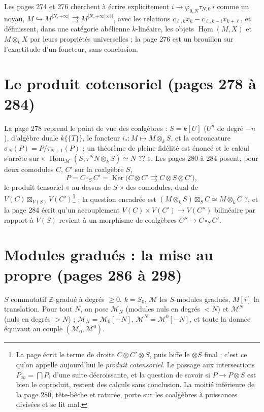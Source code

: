 \documentclass[11pt,a4paper]{article}
\begin{document}
Les pages 274 et 276 cherchent à écrire explicitement $i \to
\varphi_{0,N}\tau_{N,0}\,i$ comme un noyau, $M \hookrightarrow
M^{[N,+\infty[} \rightrightarrows M^{[N,+\infty[ \times \mathbb{N}}$, avec les
relations $c_{\ell,k}x_k - c_{\ell,k-i}x_{k+\ell}$, et définissent, dans une
catégorie abélienne $k$-linéaire, les objets $\underline{\operatorname{Hom}}(M,
X)$ et $M \otimes_k X$ par leurs propriétés universelles ; la page 276 est un
brouillon sur l'exactitude d'un foncteur, sans conclusion.

\section*{Le produit cotensoriel (pages 278 à 284)}

La page 278 reprend le point de vue des coalgèbres : $S = k[U]$ ($U^n$ de degré
$-n$), d'algèbre duale $k\{\{T\}\}$, le foncteur $i_* : M \mapsto M \otimes_k S$,
et la cotroncature $\sigma_N(P) = P/\tau_{N+1}(P)$ ; un théorème de pleine
fidélité est énoncé et le calcul s'arrête sur
« $\operatorname{Hom}_{\mathcal{M}}(S, \tau^NN \otimes_kS) \simeq N$ ?? ». Les pages
280 à 284 posent, pour deux comodules $C$, $C'$ sur la coalgèbre $S$,
\[
P = C \,\square_S\, C' = \operatorname{Ker}\bigl(C \otimes C' \rightrightarrows C \otimes S \otimes C'\bigr) ,
\]
le produit tensoriel « au-dessus de $S$ » des comodules, dual de
$V(C) \boxtimes_{V(S)} V(C')$\footnote{La page écrit le terme de droite $C
\otimes C' \otimes S$, puis biffe le $\otimes S$ final ; c'est ce qu'on appelle
aujourd'hui le \emph{produit cotensoriel}. Le passage aux intersections
$P_\infty = \bigcap P_i$ d'une suite décroissante, et la question de savoir si
$P \to P \otimes S$ est bien le coproduit, restent des calculs sans
conclusion. La moitié inférieure de la page 280, tête-bêche et raturée, porte
sur les coalgèbres à puissances divisées et se lit mal.} ; la question
encadrée est $(M \otimes_k S) \boxtimes_S C \simeq M \otimes_k C$ ?, et la page 284
écrit qu'un accouplement $V(C) \times V(C') \to V(C'')$ bilinéaire par rapport
à $V(S)$ revient à un morphisme de coalgèbres $C'' \to C \,\square_S\, C'$.

\section*{Modules gradués : la mise au propre (pages 286 à 298)}

$S$ commutatif $\mathbb{Z}$-gradué à degrés $\geq 0$, $k = S_0$,
$\mathcal{M}$ les $S$-modules gradués, $M[i]$ la translation. Pour tout $N$, on
pose $\mathcal{M}_N$ (modules nuls en degrés $< N$) et $\mathcal{M}^N$ (nuls en
degrés $> N$) ; $\mathcal{M}_N = \mathcal{M}_0[-N]$, $\mathcal{M}^N =
\mathcal{M}^0[-N]$, et toute la donnée équivaut au couple $(\mathcal{M}_0,
\mathcal{M}^0)$.
\end{document}
